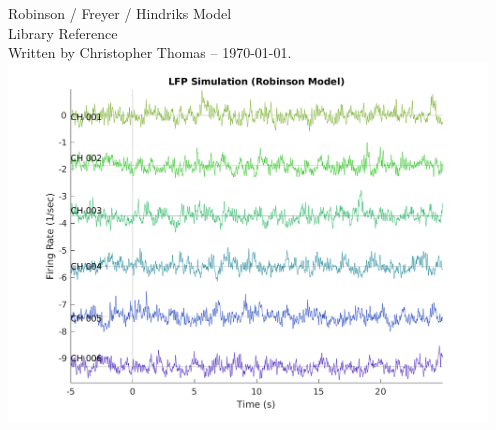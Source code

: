 \documentclass[letterpaper,11pt]{report}
\begin{document}
%
%
\pagestyle{empty}

\begin{center}
%
\vspace*{1in}
{\Huge Robinson / Freyer / Hindriks Model \\ Library Reference} \\
{\footnotesize Written by Christopher Thomas -- \today.}
%
\vspace*{1in}\\
\includegraphics[width=5in]{plots/20231205/lfp-simulation-robinson-model}
%
\end{center}
%
\vfill
{\tiny }
%
\clearpage
%
%
%
%
\pagestyle{plain}
\setcounter{page}{1}
%
%
%
\tableofcontents
\clearpage
%
%
%
\pagestyle{plain}
\setcounter{page}{1}
%



%
%
\end{document}
